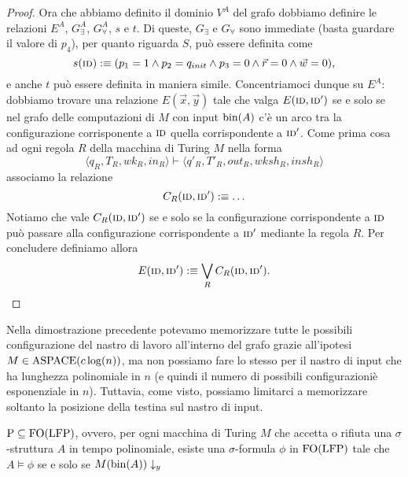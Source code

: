 \begin{proof}
  Ora che abbiamo definito il dominio $V^A$ del grafo dobbiamo definire le
  relazioni $E^A$, $G_\exists^A$, $G_\forall^A$, $s$ e $t$. Di queste, $G_\exists$
  e $G_\forall$ sono immediate
  (basta guardare il valore di $p_4$), per quanto riguarda $S$, può essere
  definita come
  \[s(\textsc{id}) :\equiv (p_1=1 \land p_2 = q_{init} \land p_3=0 \land \vec{r}=0 \land \vec{w}=0),\]
  e anche $t$ può essere definita in maniera simile.
  Concentriamoci dunque su $E^A$: dobbiamo
  trovare una relazione $E(\vec{x},\vec{y})$ tale che
  valga $E(\textsc{id}, \textsc{id}')$ se e solo se nel grafo delle
  computazioni di $M$ con input $\operatorname{bin}(A)$ c'è un arco tra la configurazione
  corrisponente a $\textsc{id}$ quella corrispondente a $\textsc{id}'$.
  Come prima cosa ad ogni regola $R$ della macchina di Turing $M$ nella forma
  \[\langle q_R, T_R, wk_R, in_R \rangle \vdash
   \langle q'_R, T'_R, out_R, wksh_R, insh_R \rangle
  \]
  associamo la relazione
  \[C_R(\textsc{id}, \textsc{id}') :\equiv \ldots \]
  Notiamo che vale $C_R(\textsc{id}, \textsc{id}')$ se e solo se la configurazione corrispondente
  a $\textsc{id}$ può passare alla configurazione corrispondente a $\textsc{id}'$ mediante la regola
  $R$. Per concludere definiamo allora
  \[ E(\textsc{id}, \textsc{id}') :\equiv \bigvee_R C_R(\textsc{id}, \textsc{id}'). \]
\end{proof}

\begin{osservazione}
  Nella dimostrazione precedente potevamo
  memorizzare tutte le possibili configurazione del nastro di lavoro all'interno
  del grafo grazie all'ipotesi $M \in \operatorname{ASPACE}(c \log(n))$, ma non possiamo
  fare lo stesso per il nastro di input che ha lunghezza
  polinomiale in $n$ (e quindi il numero di possibili configurazioniè esponenziale in $n$).
  Tuttavia, come visto, possiamo limitarci a memorizzare soltanto la posizione
  della testina sul nastro di input.
\end{osservazione}

\begin{corollario}
\label{cor:P-subset-FO(LFP)}
 $\operatorname{P} \subseteq \operatorname{FO}(\operatorname{LFP})$, ovvero, per ogni macchina di Turing $M$ che accetta o
 rifiuta una $\sigma$-struttura $A$ in tempo polinomiale, esiste una
 $\sigma$-formula $\phi$ in $\operatorname{FO}(\operatorname{LFP})$ tale che
 $A \models \phi$ se e solo se $M(\operatorname{bin}(A))\downarrow_y$
\end{corollario}



